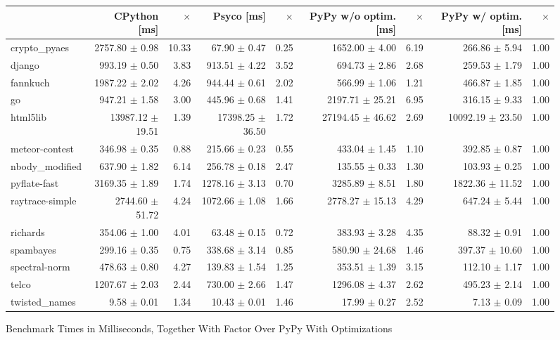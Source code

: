 \documentclass[preprint]{sigplanconf}
\begin{document}
\begin{figure}
\begin{center}
\begin{tabular}{|l||r|r||r|r||r|r||r|r|}
\hline
	&CPython [ms]	& $\times$ &Psyco [ms]	& $\times$ &PyPy w/o optim. [ms] & $\times$ &PyPy w/ optim. [ms]& $\times$ \\
\hline
crypto\_pyaes	&2757.80 $\pm$ 0.98	&10.33	&67.90 $\pm$ 0.47	&0.25	&1652.00 $\pm$ 4.00	&6.19	&266.86 $\pm$ 5.94	&1.00\\
django	&993.19 $\pm$ 0.50	&3.83	&913.51 $\pm$ 4.22	&3.52	&694.73 $\pm$ 2.86	&2.68	&259.53 $\pm$ 1.79	&1.00\\
fannkuch	&1987.22 $\pm$ 2.02	&4.26	&944.44 $\pm$ 0.61	&2.02	&566.99 $\pm$ 1.06	&1.21	&466.87 $\pm$ 1.85	&1.00\\
go	&947.21 $\pm$ 1.58	&3.00	&445.96 $\pm$ 0.68	&1.41	&2197.71 $\pm$ 25.21	&6.95	&316.15 $\pm$ 9.33	&1.00\\
html5lib	&13987.12 $\pm$ 19.51	&1.39	&17398.25 $\pm$ 36.50	&1.72	&27194.45 $\pm$ 46.62	&2.69	&10092.19 $\pm$ 23.50	&1.00\\
meteor-contest	&346.98 $\pm$ 0.35	&0.88	&215.66 $\pm$ 0.23	&0.55	&433.04 $\pm$ 1.45	&1.10	&392.85 $\pm$ 0.87	&1.00\\
nbody\_modified	&637.90 $\pm$ 1.82	&6.14	&256.78 $\pm$ 0.18	&2.47	&135.55 $\pm$ 0.33	&1.30	&103.93 $\pm$ 0.25	&1.00\\
pyflate-fast	&3169.35 $\pm$ 1.89	&1.74	&1278.16 $\pm$ 3.13	&0.70	&3285.89 $\pm$ 8.51	&1.80	&1822.36 $\pm$ 11.52	&1.00\\
raytrace-simple	&2744.60 $\pm$ 51.72	&4.24	&1072.66 $\pm$ 1.08	&1.66	&2778.27 $\pm$ 15.13	&4.29	&647.24 $\pm$ 5.44	&1.00\\
richards	&354.06 $\pm$ 1.00	&4.01	&63.48 $\pm$ 0.15	&0.72	&383.93 $\pm$ 3.28	&4.35	&88.32 $\pm$ 0.91	&1.00\\
spambayes	&299.16 $\pm$ 0.35	&0.75	&338.68 $\pm$ 3.14	&0.85	&580.90 $\pm$ 24.68	&1.46	&397.37 $\pm$ 10.60	&1.00\\
spectral-norm	&478.63 $\pm$ 0.80	&4.27	&139.83 $\pm$ 1.54	&1.25	&353.51 $\pm$ 1.39	&3.15	&112.10 $\pm$ 1.17	&1.00\\
telco	&1207.67 $\pm$ 2.03	&2.44	&730.00 $\pm$ 2.66	&1.47	&1296.08 $\pm$ 4.37	&2.62	&495.23 $\pm$ 2.14	&1.00\\
twisted\_names	&9.58 $\pm$ 0.01	&1.34	&10.43 $\pm$ 0.01	&1.46	&17.99 $\pm$ 0.27	&2.52	&7.13 $\pm$ 0.09	&1.00\\
\hline
\end{tabular}
\end{center}
\caption{Benchmark Times in Milliseconds, Together With Factor Over PyPy With Optimizations}
\label{fig:times}
\end{figure}
\end{document}
